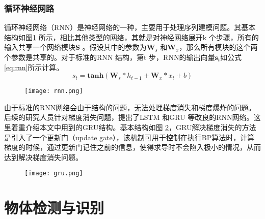\subsubsection{循环神经网路}

循环神经网络（RNN）是神经网络的一种，主要用于处理序列建模问题。其基本结构如图\ref{fig:rnn} 所示，相比其他类型的网络，其就是对神经网络展开k 个步骤，所有的输入共享一个网络模块\textbf{S} 。假设其中的参数为$\mathbf{W}_s$ 和$\mathbf{W}_x$，那么所有模块的这个两个参数是共享的。对于标准的RNN 结构，第t 步，RNN的输出向量$\mathbf{s}_t$如公式\ref{eq:rnn}所示计算。
\begin{equation}\label{eq:rnn}
    s_t = \mathbf{tanh}(\mathbf{W}_s*h_{t-1}+\mathbf{W}_x*x_{t}+b)
\end{equation}
\begin{figure}[htpb]
	\centering
	\texttt{[image: rnn.png]}
    \caption{}
	\vspace*{-3.5mm}
	\label{fig:rnn}
\end{figure}
由于标准的RNN网络会由于结构的问题，无法处理梯度消失和梯度爆炸的问题。后续的研究人员针对梯度消失问题，提出了LSTM\cite{hochreiter1997long} 和GRU\cite{cho2014learning} 等改良的RNN网络。这里着重介绍本文中用到的GRU结构。基本结构如图
\ref{fig:gru}，GRU解决梯度消失的方法是引入了一个更新门（update gate），该机制可用于控制在执行BP算法时，计算梯度的时候，通过更新门记住之前的信息，使得求导时不会陷入极小的情况，从而达到解决梯度消失问题。
\begin{figure}[htpb]
	\centering
	\texttt{[image: gru.png]}
    \caption{}
	\vspace*{-3.5mm}
	\label{fig:gru}
\end{figure}


\section{物体检测与识别}


